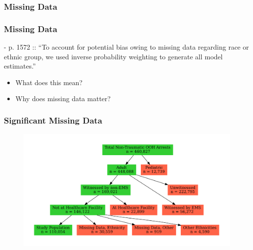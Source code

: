 \documentclass{beamer}
\begin{document}
		\subsubsection*{Missing Data}
			\begin{frame}
				\frametitle{Missing Data}
				- p. 1572 :: ``To account for potential bias owing to missing data regarding race or ethnic group, we used inverse probability weighting to generate all model estimates.''
				\begin{itemize}
					\item What does this mean?
					\item Why does missing data matter?
				\end{itemize}
			\end{frame}
						\begin{frame}
				\frametitle{Significant Missing Data}
				\begin{figure}
					\centering
					\includegraphics[width=1\linewidth]{fig_cpr-outcomes}
					\label{fig:figcpr-outcomes-}
				\end{figure}
			\end{frame}
\end{document}

